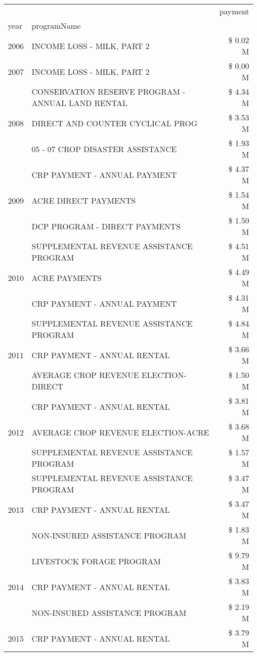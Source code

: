 \begin{tabular}{llr}
\toprule
 &  & payment \\
year & programName &  \\
\midrule
2006 & INCOME LOSS - MILK, PART 2 & \$ 0.02 M \\
\cline{1-3}
2007 & INCOME LOSS - MILK, PART 2 & \$ 0.00 M \\
\cline{1-3}
\multirow[t]{3}{*}{2008} & CONSERVATION RESERVE PROGRAM - ANNUAL LAND RENTAL & \$ 4.34 M \\
 & DIRECT AND COUNTER CYCLICAL PROG & \$ 3.53 M \\
 & 05 - 07 CROP DISASTER ASSISTANCE & \$ 1.93 M \\
\cline{1-3}
\multirow[t]{3}{*}{2009} & CRP PAYMENT - ANNUAL PAYMENT & \$ 4.37 M \\
 & ACRE DIRECT PAYMENTS & \$ 1.54 M \\
 & DCP PROGRAM - DIRECT PAYMENTS & \$ 1.50 M \\
\cline{1-3}
\multirow[t]{3}{*}{2010} & SUPPLEMENTAL REVENUE ASSISTANCE PROGRAM & \$ 4.51 M \\
 & ACRE PAYMENTS & \$ 4.49 M \\
 & CRP PAYMENT - ANNUAL PAYMENT & \$ 4.31 M \\
\cline{1-3}
\multirow[t]{3}{*}{2011} & SUPPLEMENTAL REVENUE ASSISTANCE PROGRAM & \$ 4.84 M \\
 & CRP PAYMENT - ANNUAL RENTAL & \$ 3.66 M \\
 & AVERAGE CROP REVENUE ELECTION-DIRECT & \$ 1.50 M \\
\cline{1-3}
\multirow[t]{3}{*}{2012} & CRP PAYMENT - ANNUAL RENTAL & \$ 3.81 M \\
 & AVERAGE CROP REVENUE ELECTION-ACRE & \$ 3.68 M \\
 & SUPPLEMENTAL REVENUE ASSISTANCE PROGRAM & \$ 1.57 M \\
\cline{1-3}
\multirow[t]{3}{*}{2013} & SUPPLEMENTAL REVENUE ASSISTANCE PROGRAM & \$ 3.47 M \\
 & CRP PAYMENT - ANNUAL RENTAL & \$ 3.47 M \\
 & NON-INSURED ASSISTANCE PROGRAM & \$ 1.83 M \\
\cline{1-3}
\multirow[t]{3}{*}{2014} & LIVESTOCK FORAGE PROGRAM & \$ 9.79 M \\
 & CRP PAYMENT - ANNUAL RENTAL & \$ 3.83 M \\
 & NON-INSURED ASSISTANCE PROGRAM & \$ 2.19 M \\
\cline{1-3}
\multirow[t]{3}{*}{2015} & CRP PAYMENT - ANNUAL RENTAL & \$ 3.79 M \\

\end{tabular}
